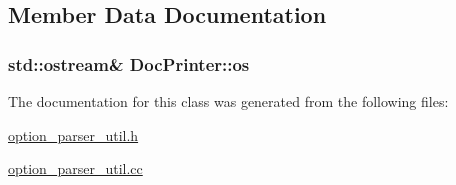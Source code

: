 \subsection{Member Data Documentation}
\hypertarget{classDocPrinter_a30860614cca992c360838670c209eb00}{
\subsubsection[{os}]{\setlength{\rightskip}{0pt plus 5cm}std\-::ostream\& Doc\-Printer\-::os\hspace{0.3cm}{\ttfamily [protected]}}}\label{classDocPrinter_a30860614cca992c360838670c209eb00}


The documentation for this class was generated from the following files\-:\begin{DoxyCompactItemize}
\item 
\hyperlink{option__parser__util_8h}{option\-\_\-parser\-\_\-util.\-h}\item 
\hyperlink{option__parser__util_8cc}{option\-\_\-parser\-\_\-util.\-cc}\end{DoxyCompactItemize}

